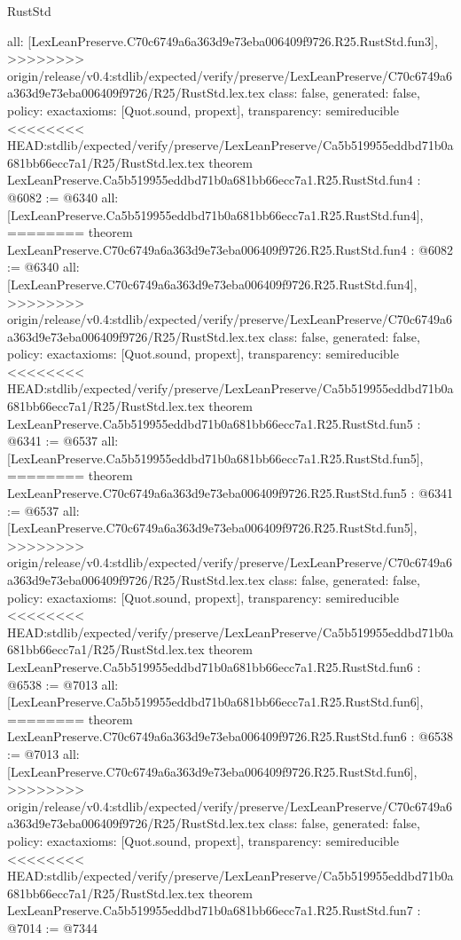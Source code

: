 \begin{lexlean}{RustStd}
\begin{coremodule}
{\begin{coremodule}
{{{{{{{  all: [LexLeanPreserve.C70c6749a6a363d9e73eba006409f9726.R25.RustStd.fun3],
>>>>>>>> origin/release/v0.4:stdlib/expected/verify/preserve/LexLeanPreserve/C70c6749a6a363d9e73eba006409f9726/R25/RustStd.lex.tex
  class: false,
  generated: false,
  policy: exact{axioms: [Quot.sound, propext]},
  transparency: semireducible
}
<<<<<<<< HEAD:stdlib/expected/verify/preserve/LexLeanPreserve/Ca5b519955eddbd71b0a681bb66ecc7a1/R25/RustStd.lex.tex
theorem LexLeanPreserve.Ca5b519955eddbd71b0a681bb66ecc7a1.R25.RustStd.fun4 : @6082 := @6340 {
  all: [LexLeanPreserve.Ca5b519955eddbd71b0a681bb66ecc7a1.R25.RustStd.fun4],
========
theorem LexLeanPreserve.C70c6749a6a363d9e73eba006409f9726.R25.RustStd.fun4 : @6082 := @6340 {
  all: [LexLeanPreserve.C70c6749a6a363d9e73eba006409f9726.R25.RustStd.fun4],
>>>>>>>> origin/release/v0.4:stdlib/expected/verify/preserve/LexLeanPreserve/C70c6749a6a363d9e73eba006409f9726/R25/RustStd.lex.tex
  class: false,
  generated: false,
  policy: exact{axioms: [Quot.sound, propext]},
  transparency: semireducible
}
<<<<<<<< HEAD:stdlib/expected/verify/preserve/LexLeanPreserve/Ca5b519955eddbd71b0a681bb66ecc7a1/R25/RustStd.lex.tex
theorem LexLeanPreserve.Ca5b519955eddbd71b0a681bb66ecc7a1.R25.RustStd.fun5 : @6341 := @6537 {
  all: [LexLeanPreserve.Ca5b519955eddbd71b0a681bb66ecc7a1.R25.RustStd.fun5],
========
theorem LexLeanPreserve.C70c6749a6a363d9e73eba006409f9726.R25.RustStd.fun5 : @6341 := @6537 {
  all: [LexLeanPreserve.C70c6749a6a363d9e73eba006409f9726.R25.RustStd.fun5],
>>>>>>>> origin/release/v0.4:stdlib/expected/verify/preserve/LexLeanPreserve/C70c6749a6a363d9e73eba006409f9726/R25/RustStd.lex.tex
  class: false,
  generated: false,
  policy: exact{axioms: [Quot.sound, propext]},
  transparency: semireducible
}
<<<<<<<< HEAD:stdlib/expected/verify/preserve/LexLeanPreserve/Ca5b519955eddbd71b0a681bb66ecc7a1/R25/RustStd.lex.tex
theorem LexLeanPreserve.Ca5b519955eddbd71b0a681bb66ecc7a1.R25.RustStd.fun6 : @6538 := @7013 {
  all: [LexLeanPreserve.Ca5b519955eddbd71b0a681bb66ecc7a1.R25.RustStd.fun6],
========
theorem LexLeanPreserve.C70c6749a6a363d9e73eba006409f9726.R25.RustStd.fun6 : @6538 := @7013 {
  all: [LexLeanPreserve.C70c6749a6a363d9e73eba006409f9726.R25.RustStd.fun6],
>>>>>>>> origin/release/v0.4:stdlib/expected/verify/preserve/LexLeanPreserve/C70c6749a6a363d9e73eba006409f9726/R25/RustStd.lex.tex
  class: false,
  generated: false,
  policy: exact{axioms: [Quot.sound, propext]},
  transparency: semireducible
}
<<<<<<<< HEAD:stdlib/expected/verify/preserve/LexLeanPreserve/Ca5b519955eddbd71b0a681bb66ecc7a1/R25/RustStd.lex.tex
theorem LexLeanPreserve.Ca5b519955eddbd71b0a681bb66ecc7a1.R25.RustStd.fun7 : @7014 := @7344 {
}}}}}}}}}}
\end{coremodule}}
\end{coremodule}
\end{lexlean}

